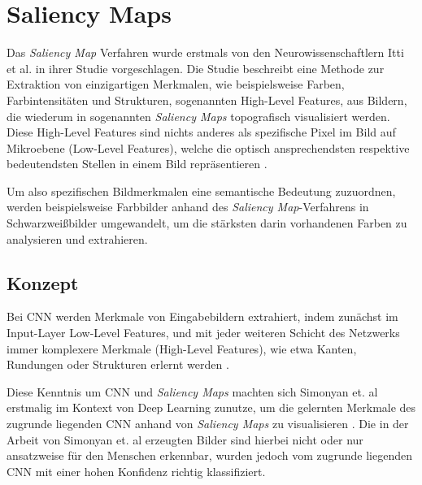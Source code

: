 \chapter{Saliency Maps}
\label{cha:saliency}
Das \textit{Saliency Map} Verfahren wurde erstmals von den Neurowissenschaftlern Itti et al. \cite{itti_model_1998} in ihrer Studie vorgeschlagen. 
Die Studie beschreibt eine Methode zur Extraktion von einzigartigen Merkmalen, wie beispielsweise Farben, Farbintensitäten und Strukturen, sogenannten High-Level Features, aus Bildern, die wiederum in sogenannten \textit{Saliency Maps} topografisch visualisiert werden. 
Diese High-Level Features sind nichts anderes als spezifische Pixel im Bild auf Mikroebene (Low-Level Features), welche die optisch ansprechendsten respektive bedeutendsten Stellen in einem Bild repräsentieren \cite{itti_model_1998}. 

Um also spezifischen Bildmerkmalen eine semantische Bedeutung zuzuordnen, werden beispielsweise Farbbilder anhand des \textit{Saliency Map}-Verfahrens in Schwarzweißbilder umgewandelt, um die stärksten darin vorhandenen Farben zu analysieren und extrahieren.

\section{Konzept}
\label{cha:saliency_konz}
Bei \ac{CNN} werden Merkmale von Eingabebildern extrahiert, indem zunächst im Input-Layer Low-Level Features, und mit jeder weiteren Schicht des Netzwerks immer komplexere Merkmale (High-Level Features), wie etwa Kanten, Rundungen oder Strukturen erlernt werden \cite{stanford_unsupervised_tutorial}.

Diese Kenntnis um \ac{CNN} und \textit{Saliency Maps} machten sich Simonyan et. al erstmalig im Kontext von Deep Learning zunutze, um die gelernten Merkmale des zugrunde liegenden \ac{CNN} anhand von \textit{Saliency Maps} zu visualisieren \cite{simonyan_deep_2013}. 
Die in der Arbeit von Simonyan et. al erzeugten Bilder sind hierbei nicht oder nur ansatzweise für den Menschen erkennbar, wurden jedoch vom zugrunde liegenden \ac{CNN} mit einer hohen Konfidenz richtig klassifiziert.
~\newline

